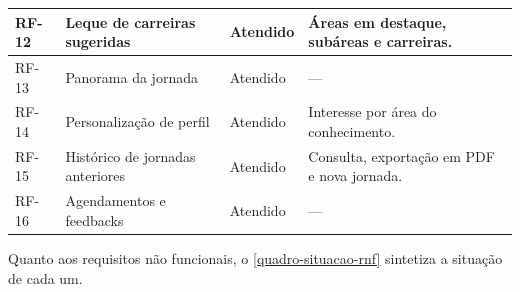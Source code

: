 {\begin{xltabular}{\textwidth}{|>{\raggedright\arraybackslash}p{1.8cm}|>{\raggedright\arraybackslash}p{4.7cm}|>{\raggedright\arraybackslash}p{2.5cm}|>{\raggedright\arraybackslash}X|}
\hline
RF-12 & Leque de carreiras sugeridas & Atendido & Áreas em destaque, subáreas e carreiras. \\
\hline
RF-13 & Panorama da jornada & Atendido & — \\
\hline
RF-14 & Personalização de perfil & Atendido & Interesse por área do conhecimento. \\
\hline
RF-15 & Histórico de jornadas anteriores & Atendido & Consulta, exportação em PDF e nova jornada. \\
\hline
RF-16 & Agendamentos e feedbacks & Atendido & — \\
\hline
\end{xltabular}
}

Quanto aos requisitos não funcionais, o \autoref{quadro-situacao-rnf} sintetiza a situação de cada um.

